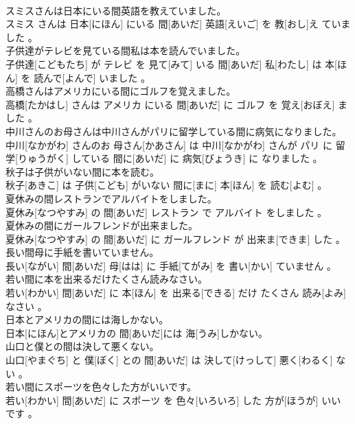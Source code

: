 \documentclass[8pt]{extreport}
\begin{document}
\begin{CJK}{UTF8}{min}
\\	スミスさんは日本にいる間英語を教えていました。	
\\	スミス さんは 日本[にほん] にいる 間[あいだ] 英語[えいご] を 教[おし]え ていました 。
\\	子供達がテレビを見ている間私は本を読んでいました。	
\\	子供達[こどもたち] が テレビ を 見て[みて] いる 間[あいだ] 私[わたし] は 本[ほん] を 読んで[よんで] いました 。
\\	高橋さんはアメリカにいる間にゴルフを覚えました。	
\\	高橋[たかはし] さんは アメリカ にいる 間[あいだ] に ゴルフ を 覚え[おぼえ] ました 。
\\	中川さんのお母さんは中川さんがパリに留学している間に病気になりました。	
\\	中川[なかがわ] さんのお 母さん[かあさん] は 中川[なかがわ] さんが パリ に 留学[りゅうがく] している 間に[あいだ] に 病気[びょうき] に なりました 。
\\	秋子は子供がいない間に本を読む。	
\\	秋子[あきこ] は 子供[こども] がいない 間に[まに] 本[ほん] を 読む[よむ] 。
\\	夏休みの間レストランでアルバイトをしました。	
\\	夏休み[なつやすみ] の 間[あいだ] レストラン で アルバイト をしました 。
\\	夏休みの間にガールフレンドが出来ました。	
\\	夏休み[なつやすみ] の 間[あいだ] に ガールフレンド が 出来ま[できま] した 。
\\	長い間母に手紙を書いていません。	
\\	長い[ながい] 間[あいだ] 母[はは] に 手紙[てがみ] を 書い[かい] ていません 。
\\	若い間に本を出来るだけたくさん読みなさい。	
\\	若い[わかい] 間[あいだ] に 本[ほん] を 出来る[できる] だけ たくさん 読み[よみ] なさい 。
\\	日本とアメリカの間には海しかない。	
\\	日本[にほん]とアメリカの 間[あいだ]には 海[うみ]しかない。
\\	山口と僕との間は決して悪くない。	
\\	山口[やまぐち] と 僕[ぼく] との 間[あいだ] は 決して[けっして] 悪く[わるく] ない 。
\\	若い間にスポーツを色々した方がいいです。	
\\	若い[わかい] 間[あいだ] に スポーツ を 色々[いろいろ] した 方が[ほうが] いい です 。

\end{CJK}
\end{document}
